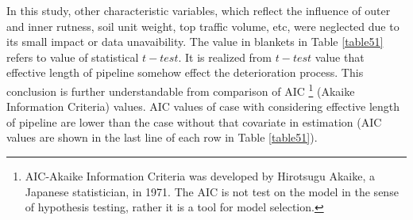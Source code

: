 In this study, other characteristic variables, which reflect the influence of outer and inner rutness, soil unit weight, top traffic volume, etc, were neglected due to its small impact or data unavaibility. The value in blankets in Table \ref{table51} refers to value of statistical $t-test$. It is realized from $t-test$ value that effective length of pipeline somehow effect the deterioration process. This conclusion is further understandable from comparison of AIC \footnote{AIC-Akaike Information Criteria was developed by Hirotsugu Akaike, a Japanese statistician, in 1971. The AIC is not test on the model in the sense of hypothesis testing, rather it is a tool for model selection.} (Akaike Information Criteria)  \cite{akaike} values. AIC values of case with considering effective length of pipeline are lower than the case without that covariate in estimation (AIC values are shown in the last line of each row in Table \ref{table51}).
%
